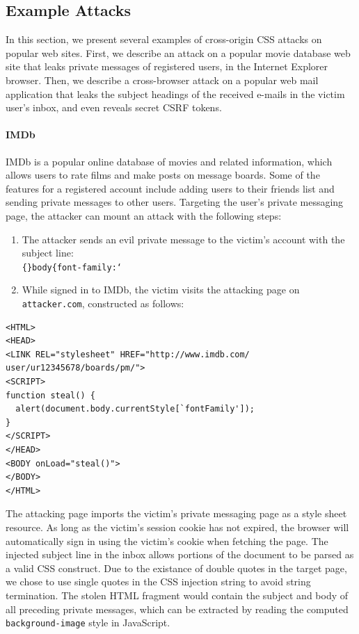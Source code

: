 \documentclass{acm_proc_article-sp}
\begin{document}
\subsection{Example Attacks}
In this section, we present several examples of cross-origin CSS attacks on popular web sites. First, we describe an attack on a popular movie database web site that leaks private messages of registered users, in the Internet Explorer browser. Then, we describe a cross-browser attack on a popular web mail application that leaks the subject headings of the received e-mails in the victim user's inbox, and even reveals secret CSRF tokens.

\paragraph{IMDb} IMDb is a popular online database of movies and related information, which allows users to rate films and make posts on message boards. Some of the features for a registered account include adding users to their friends list and sending private messages to other users. Targeting the user's private messaging page, the attacker can mount an attack with the following steps:
\begin{enumerate}
\item{The attacker sends an evil private message to the victim's account with the subject line:\\ \texttt{\{\}body\{font-family:`} }
\item{While signed in to IMDb, the victim visits the attacking page on \texttt{attacker.com}, constructed as follows:}
\end{enumerate}
\begin{verbatim}
<HTML>
<HEAD>
<LINK REL="stylesheet" HREF="http://www.imdb.com/
user/ur12345678/boards/pm/">
<SCRIPT>
function steal() {
  alert(document.body.currentStyle[`fontFamily']);
}
</SCRIPT>
</HEAD>
<BODY onLoad="steal()">
</BODY>
</HTML>
\end{verbatim}

The attacking page imports the victim's private messaging page as a style sheet resource. As long as the victim's session cookie has not expired, the browser will automatically sign in using the victim's cookie when fetching the page. The injected subject line in the inbox allows portions of the document to be parsed as a valid CSS construct. Due to the existance of double quotes in the target page, we chose to use single quotes in the CSS injection string to avoid string termination. The stolen HTML fragment would contain the subject and body of all preceding private messages, which can be extracted by reading the computed \texttt{background-image} style in JavaScript.
\end{document}
